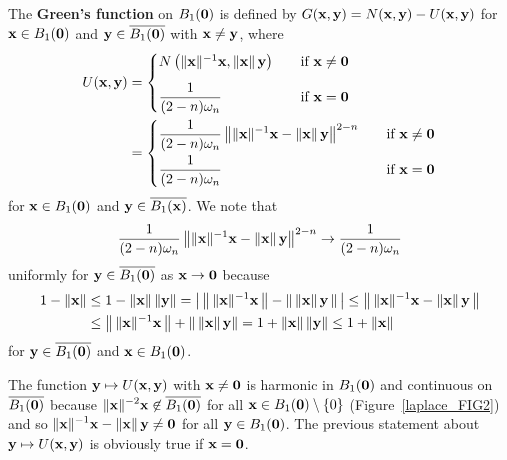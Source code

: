 The {\bfseries Green's function} on $B_1(\mathbf{0})$ is
defined by $G(\mathbf{x},\mathbf{y}) = N(\mathbf{x},\mathbf{y}) - U(\mathbf{x},\mathbf{y})$
for $\mathbf{x} \in B_1(\mathbf{0})$ and $\mathbf{y} \in \overline{B_1(\mathbf{0})}$ with
$\mathbf{x} \neq \mathbf{y}$, where
\begin{align*}
U(\mathbf{x},\mathbf{y}) &=
\begin{cases}
N\left(\|\mathbf{x}\|^{-1} \mathbf{x},\|\mathbf{x}\|\,\mathbf{y}\right) &
\quad \text{if} \ \mathbf{x} \neq \mathbf{0} \\[0.8em]
\displaystyle \frac{1}{(2-n)\omega_n} & \quad \text{if} \ \mathbf{x} = \mathbf{0}
\end{cases} \\
&= \begin{cases}
\displaystyle \frac{1}{(2-n)\omega_n}
\left\| \|\mathbf{x}\|^{-1}\mathbf{x} - \|\mathbf{x}\|\,\mathbf{y}\right\|^{2-n}
& \quad \text{if} \ \mathbf{x} \neq \mathbf{0} \\[0.8em]
\displaystyle \frac{1}{(2-n)\omega_n} & \quad \text{if} \ \mathbf{x} = \mathbf{0}
\end{cases}
\end{align*}
for $\mathbf{x} \in B_1(\mathbf{0})$ and $\mathbf{y} \in \overline{B_1(\mathbf{x})}$.
We note that
\[
\frac{1}{(2-n)\omega_n}
\left\| \|\mathbf{x}\|^{-1}\mathbf{x} -\|\mathbf{x}\|\,\mathbf{y}\right\|^{2-n}
\rightarrow  \frac{1}{(2-n)\omega_n}
\]
uniformly for $\mathbf{y} \in \overline{B_1(\mathbf{0})}$ as
$\mathbf{x}\rightarrow \mathbf{0}$ because
\begin{align*}
1-\|\mathbf{x}\| &\leq 1 - \|\mathbf{x}\|\,\|\mathbf{y}\| =
\left|\, \left\|\, \|\mathbf{x}\|^{-1}\mathbf{x} \, \right\| -
\left\|\, \|\mathbf{x}\|\,\mathbf{y} \, \right\|\, \right|
\leq \left\|\, \|\mathbf{x}\|^{-1}\mathbf{x} -\|\mathbf{x}\|\,\mathbf{y} \,\right\| \\
&\leq \left\|\, \|\mathbf{x}\|^{-1}\mathbf{x} \,\right\|
+\left\|\, \|\mathbf{x}\|\,\mathbf{y} \right\| = 1 + \|\mathbf{x}\|\,\|\mathbf{y}\|
\leq 1 + \|\mathbf{x}\|
\end{align*}
for $\mathbf{y}\in \overline{B_1(\mathbf{0})}$ and
$\mathbf{x}\in B_1(\mathbf{0})$.

The function $\mathbf{y} \mapsto U(\mathbf{x},\mathbf{y})$ with
$\mathbf{x} \neq \mathbf{0}$ is harmonic in $B_1(\mathbf{0})$ and continuous on
$\overline{B_1(\mathbf{0})}$ because
$\displaystyle \|\mathbf{x}\|^{-2}\mathbf{x} \not\in \overline{B_1(\mathbf{0})}$ for all
$\mathbf{x} \in B_1(\mathbf{0}) \setminus \{0\}$ (Figure~\ref{laplace_FIG2})
and so
$\displaystyle \|\mathbf{x}\|^{-1}\mathbf{x} -\|\mathbf{x}\|\,\mathbf{y} \neq \mathbf{0}$
for all $\mathbf{y} \in B_1(\mathbf{0})$.  The previous statement about
$\mathbf{y} \mapsto U(\mathbf{x},\mathbf{y})$ is obviously true
if $\mathbf{x} = \mathbf{0}$.

